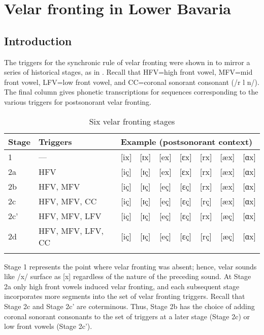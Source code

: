 \chapter{Velar fronting in Lower Bavaria}\label{sec:13}

\section{Introduction}\label{sec:13.1}

The triggers for the synchronic rule of velar fronting were shown in  to mirror a series of historical stages, as in . Recall that HFV=high front vowel, MFV=mid front vowel, LFV=low front vowel, and CC=coronal sonorant consonant (/r l n/). The final column gives phonetic transcriptions for sequences corresponding to the various triggers for postsonorant velar fronting.

\begin{table}
\caption{Six velar fronting stages\label{tab:13.1}}
\begin{tabular}{ll ccccccc}
\lsptoprule
Stage & Triggers        & \multicolumn{7}{l}{Example (postsonorant context)}\\
\midrule
1   & ---               & [ix]& [ɪx]& [ex]& [ɛx]& [rx]& [æx]& [ɑx]\\
2a  & HFV               & [iç]& [ɪç]& [ex]& [ɛx]& [rx]& [æx]& [ɑx]\\
2b  & HFV, MFV          & [iç]& [ɪç]& [eç]& [ɛç]& [rx]& [æx]& [ɑx]\\
2c  & HFV, MFV, CC      & [iç]& [ɪç]& [eç]& [ɛç]& [rç]& [æx]& [ɑx]\\
2c' & HFV, MFV, LFV     & [iç]& [ɪç]& [eç]& [ɛç]& [rx]& [æç]& [ɑx]\\
2d  & HFV, MFV, LFV, CC & [iç]& [ɪç]& [eç]& [ɛç]& [rç]& [æç]& [ɑx]\\
\lspbottomrule
\end{tabular}
\end{table}

Stage 1 represents the point where velar fronting was absent; hence, velar sounds like /x/ surface as [x] regardless of the nature of the preceding sound. At Stage 2a only high front vowels induced velar fronting, and each subsequent stage incorporates more segments into the set of velar fronting triggers. Recall that Stage 2c and Stage 2c{}' are coterminous. Thus, Stage 2b has the choice of adding coronal sonorant consonants to the set of triggers at a later stage (Stage 2c) or low front vowels (Stage 2c{}').

